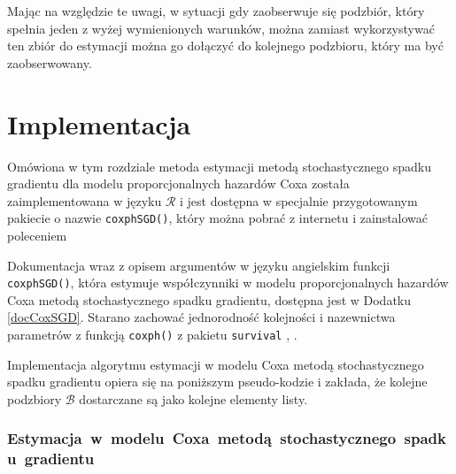 Mając na względzie te uwagi, w sytuacji gdy zaobserwuje się podzbiór, który spełnia jeden z wyżej wymienionych warunków, można zamiast wykorzystywać ten zbiór do estymacji można go dołączyć do kolejnego podzbioru, który ma być zaobserwowany.

\newpage
\section{Implementacja}\label{implemento}

Omówiona w tym rozdziale metoda estymacji metodą stochastycznego spadku gradientu dla modelu proporcjonalnych hazardów Coxa została zaimplementowana w języku $\mathcal{R}$ \cite{programikr} i jest dostępna w specjalnie przygotowanym pakiecie o nazwie \texttt{coxphSGD()}, który można pobrać z internetu i zainstalować poleceniem
\begin{Shaded}
\begin{Highlighting}[]
\NormalTok{(}\NormalTok{)}
\end{Highlighting}
\end{Shaded}

Dokumentacja wraz z opisem argumentów w języku angielskim funkcji \texttt{coxphSGD()}, która estymuje współczynniki w modelu
proporcjonalnych hazardów Coxa metodą stochastycznego spadku gradientu, dostępna jest w Dodatku \ref{docCoxSGD}.
Starano zachować jednorodność kolejności i nazewnictwa parametrów z funkcją \texttt{coxph()} z pakietu \texttt{survival} \cite{ther}, \cite{survival}.

Implementacja algorytmu estymacji w modelu Coxa metodą stochastycznego spadku gradientu opiera się na poniższym pseudo-kodzie i zakłada, że kolejne podzbiory \(\mathcal{B}\) dostarczane są jako kolejne elementy listy.
\subsubsection{Estymacja~w~modelu~Coxa~metodą~stochastycznego~spadku~gradientu}


